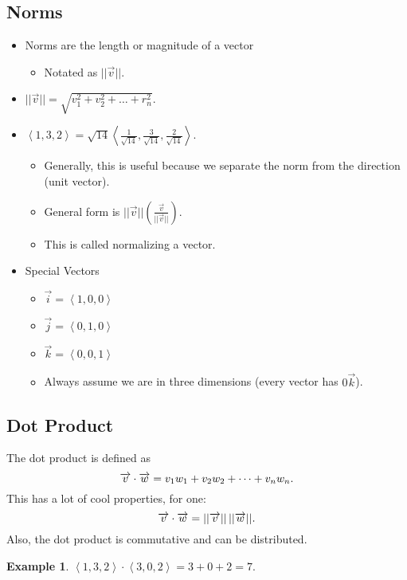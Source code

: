\documentclass[12pt]{article}
\theoremstyle{plain} %
\theoremstyle{definition}
\theoremstyle{definition}
\theoremstyle{definition}
\newtheorem{exmp}{Example}[section]
\theoremstyle{remark}
\newcommand{\angled}[1]{\left\langle {#1} \right\rangle}
\newcommand*{\vv}[1]{\overrightarrow{\mkern0mu#1}}
\begin{document}
\subsection{Norms}
\begin{itemize}
    \item Norms are the length or magnitude of a vector
    \begin{itemize}
        \item Notated as $||\overrightarrow{v}||$.
    \end{itemize}
    \item $|| \overrightarrow{v} || = \sqrt{v_1^2 + v_2^2 + \dots + r_n^2}$.
    \item $\angled{1,3,2} = \sqrt{14} \angled{\frac{1}{\sqrt{14}},\frac{3}{\sqrt{14}},\frac{2}{\sqrt{14}}}$.
    \begin{itemize}
        \item Generally, this is useful because we separate the norm from the direction (unit vector).
        \item General form is $|| \vec{v} || (\frac{\vec{v}}{||\vec{v}||})$.
        \item This is called normalizing a vector.
    \end{itemize}
    \item Special Vectors
    \begin{itemize}
        \item $\vec{i} = \angled{1,0,0}$
        \item $\vec{j} = \angled{0,1,0}$
        \item $\vec{k} = \angled{0,0,1}$
        \item Always assume we are in three dimensions (every vector has $0\overrightarrow{k}$).
    \end{itemize}
\end{itemize}

\subsection{Dot Product}
The dot product is defined as
\[ \vv{v} \cdot \vv{w} = v_1w_1 + v_2w_2 + \dots + v_nw_n. \]
This has a lot of cool properties, for one: \[\vv{v} \cdot \vv{w} = ||\vv{v}||\,||\vv{w}||.\]
Also, the dot product is commutative and can be distributed.
\begin{exmp}
    $\angled{1,3,2} \cdot \angled{3,0,2} = 3+0+2 = 7$.
\end{exmp}
\end{document}
